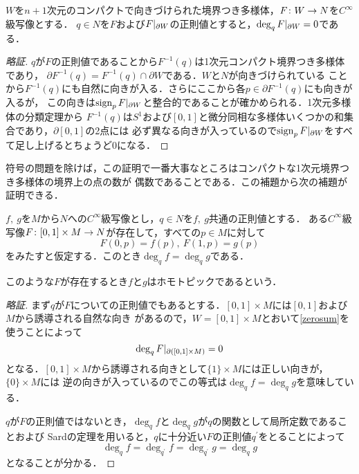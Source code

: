 \documentclass[dvipdfmx,uplatex]{jsarticle}
\DeclareMathOperator{\sign}{sign}
\begin{document}
\begin{lemma}\label{zerosum}
$W$を$n+1$次元のコンパクトで向きづけられた境界つき多様体，$F\colon W\to N$を$C^\infty$級写像とする．
$q\in N$を$F$および$F|_{\partial W}$の正則値とすると，$\deg _q F|_{\partial W}=0$である．
\end{lemma}

\begin{proof}[略証]
$q$が$F$の正則値であることから$F^{-1}(q)$は1次元コンパクト境界つき多様体であり，
$\partial F^{-1}(q)=F^{-1}(q)\cap \partial W$である．$W$と$N$が向きづけられている
ことから$F^{-1}(q)$にも自然に向きが入る．さらにここから各$p\in \partial F^{-1}(q)$にも向きが入るが，
この向きは$\sign_p \restr{F}{\partial W}$と整合的であることが確かめられる．1次元多様体の分類定理から
$F^{-1}(q)$は$S^1$および$[0,1]$と微分同相な多様体いくつかの和集合であり，$\partial [0,1]$の2点には
必ず異なる向きが入っているので$\sign _p \restr{F}{\partial W}$をすべて足し上げるとちょうど0になる．
\end{proof}

符号の問題を除けば，この証明で一番大事なところはコンパクトな1次元境界つき多様体の境界上の点の数が
偶数であることである．この補題から次の補題が証明できる．

\begin{lemma}
$f,\ g$を$M$から$N$への$C^\infty$級写像とし，$q\in N$を$f,\ g$共通の正則値とする．
ある$C^\infty$級写像$F\colon[0,1]\times M\to N$が存在して，すべての$p\in M$に対して
\[ F(0,p)=f(p),\ F(1,p)=g(p) \]
をみたすと仮定する．このとき$\deg_q f=\deg_q g$である．
\end{lemma}

このような$F$が存在するとき$f$と$g$はホモトピックであるという．

\begin{proof}[略証]
まず$q$が$F$についての正則値でもあるとする．$[0,1]\times M$には$[0,1]$および$M$から誘導される自然な向き
があるので，$W=[0,1]\times M$とおいて\cref{zerosum}を使うことによって
\[ \deg_q F|_{\partial ([0,1]\times M)} =0 \]
となる．$[0,1]\times M$から誘導される向きとして$\{1\}\times M$には正しい向きが，$\{0\}\times M$には
逆の向きが入っているのでこの等式は$\deg_q f= \deg_q g$を意味している．

$q$が$F$の正則値ではないとき，$\deg_q f$と$\deg_q g$が$q$の関数として局所定数であることおよび
Sardの定理を用いると，$q$に十分近い$F$の正則値$q^\prime$をとることによって
\[ \deg_q f =\deg_{q^\prime}f = \deg_{q^\prime} g =\deg_q g\]
となることが分かる．
\end{proof}
\end{document}

